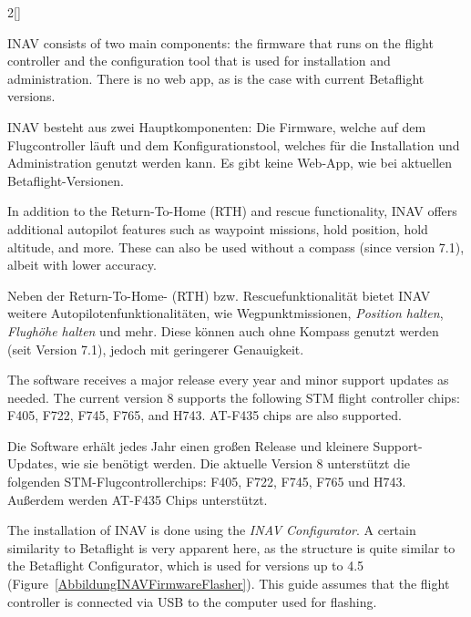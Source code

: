 \begin{paracol}{2}[]
\colende

\renewcommand{\deutschertitel}{INAV}
\renewcommand{\englischertitel}{INAV}
\makroabschnitt
\label{AbschnittINAV}

INAV consists of two main components: the firmware that runs on the flight controller and the configuration tool that is used for installation and administration. There is no web app, as is the case with current Betaflight versions.

 \colger

INAV besteht aus zwei Hauptkomponenten: Die Firmware, welche auf dem Flugcontroller läuft und dem Konfigurationstool, welches für die Installation und Administration genutzt werden kann. Es gibt keine Web-App, wie bei aktuellen Betaflight-Versionen.

\coleng

In addition to the Return-To-Home (RTH) and rescue functionality, INAV offers additional autopilot features such as waypoint missions, hold position, hold altitude, and more. These can also be used without a compass (since version 7.1), albeit with lower accuracy.

\colger

Neben der Return-To-Home- (RTH) bzw. Rescuefunktionalität bietet INAV weitere Autopilotenfunktionalitäten, wie Wegpunktmissionen, \textsl{Position halten}, \textsl{Flughöhe halten} und mehr. Diese können auch ohne Kompass genutzt werden (seit Version 7.1), jedoch mit geringerer Genauigkeit.

\coleng

The software receives a major release every year and minor support updates as needed. The current version 8 supports the following STM flight controller chips: F405, F722, F745, F765, and H743. AT-F435 chips are also supported.

\colger

Die Software erhält jedes Jahr einen großen Release und kleinere Support-Updates, wie sie benötigt werden. Die aktuelle Version 8 unterstützt die folgenden STM-Flugcontrollerchips: F405, F722, F745, F765 und H743. Außerdem werden AT-F435 Chips unterstützt.

\colende

\renewcommand{\deutschertitel}{Installation}
\renewcommand{\englischertitel}{Installation}
\makrounterabschnitt
\label{AbschnittInstallationINAV}

The installation of INAV is done using the \textsl{INAV Configurator}. A certain similarity to Betaflight is very apparent here, as the structure is quite similar to the Betaflight Configurator, which is used for versions up to 4.5 (Figure~\ref{AbbildungINAVFirmwareFlasher}). This guide assumes that the flight controller is connected via USB to the computer used for flashing.


\end{paracol}

